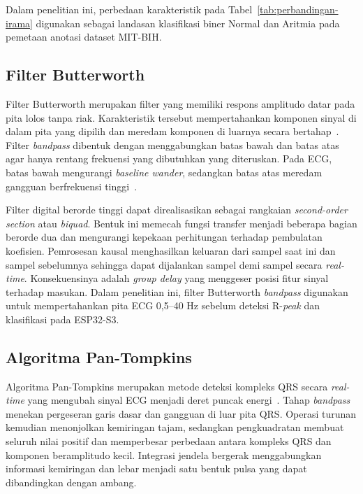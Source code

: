 Dalam penelitian ini, perbedaan karakteristik pada
Tabel~\ref{tab:perbandingan-irama} digunakan sebagai landasan klasifikasi
biner Normal dan Aritmia pada pemetaan anotasi dataset MIT-BIH.

\subsection{Filter Butterworth}

Filter Butterworth merupakan filter yang memiliki respons amplitudo datar pada pita lolos tanpa riak. Karakteristik tersebut mempertahankan komponen sinyal di dalam pita yang dipilih dan meredam komponen di luarnya secara bertahap~\cite{bui_2021}. Filter \textit{bandpass} dibentuk dengan menggabungkan batas bawah dan batas atas agar hanya rentang frekuensi yang dibutuhkan yang diteruskan. Pada ECG, batas bawah mengurangi \textit{baseline wander}, sedangkan batas atas meredam gangguan berfrekuensi tinggi~\cite{zambrano_2026, bui_2021}.

Filter digital berorde tinggi dapat direalisasikan sebagai rangkaian \textit{second-order section} atau \textit{biquad}. Bentuk ini memecah fungsi transfer menjadi beberapa bagian berorde dua dan mengurangi kepekaan perhitungan terhadap pembulatan koefisien. Pemrosesan kausal menghasilkan keluaran dari sampel saat ini dan sampel sebelumnya sehingga dapat dijalankan sampel demi sampel secara \textit{real-time}. Konsekuensinya adalah \textit{group delay} yang menggeser posisi fitur sinyal terhadap masukan. Dalam penelitian ini, filter Butterworth \textit{bandpass} digunakan untuk mempertahankan pita ECG 0,5--40 Hz sebelum deteksi R-\textit{peak} dan klasifikasi pada ESP32-S3.

\subsection{Algoritma Pan-Tompkins}

Algoritma Pan-Tompkins merupakan metode deteksi kompleks QRS secara \textit{real-time} yang mengubah sinyal ECG menjadi deret puncak energi~\cite{pan_tompkins_1985}. Tahap \textit{bandpass} menekan pergeseran garis dasar dan gangguan di luar pita QRS. Operasi turunan kemudian menonjolkan kemiringan tajam, sedangkan pengkuadratan membuat seluruh nilai positif dan memperbesar perbedaan antara kompleks QRS dan komponen beramplitudo kecil. Integrasi jendela bergerak menggabungkan informasi kemiringan dan lebar menjadi satu bentuk pulsa yang dapat dibandingkan dengan ambang.

